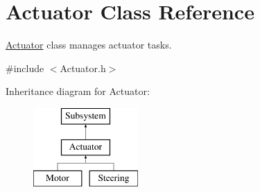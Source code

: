 \hypertarget{classActuator}{\section{Actuator Class Reference}
\label{classActuator}
}


\hyperlink{classActuator}{Actuator} class manages actuator tasks.  




{\ttfamily \#include $<$Actuator.\-h$>$}

Inheritance diagram for Actuator\-:\begin{figure}[H]
\begin{center}
\leavevmode
\includegraphics[height=3.000000cm]{classActuator}
\end{center}
\end{figure}
